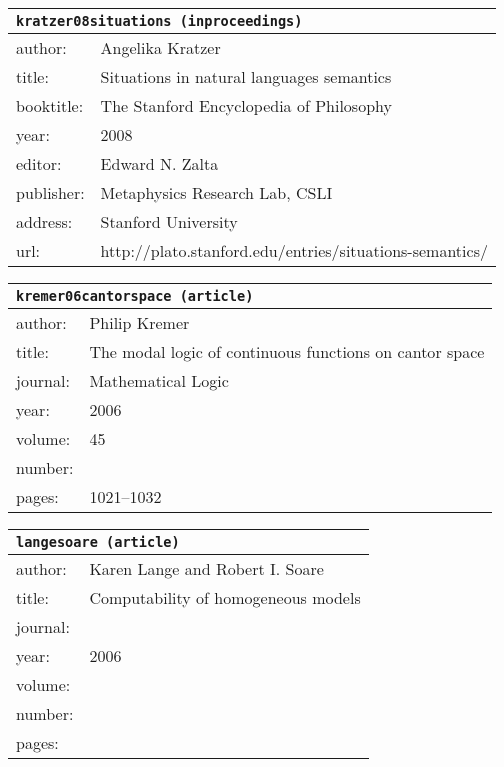 \documentclass{article}
\begin{document}
\bigskip

\begin{tabular}{p{}p{}}
\multicolumn{2}{l}{\texttt{kratzer08situations (inproceedings)}}\\
\hline
author: & Angelika Kratzer\\
title: & Situations in natural languages semantics\\
booktitle: & The Stanford Encyclopedia of Philosophy\\
year: & 2008\\
editor: & Edward N. Zalta\\
publisher: & Metaphysics Research Lab, CSLI\\
address: & Stanford University\\
url: & http://plato.stanford.edu/entries/situations-semantics/\\
\end{tabular}

\bigskip

\begin{tabular}{p{}p{}}
\multicolumn{2}{l}{\texttt{kremer06cantorspace (article)}}\\
\hline
author: & Philip Kremer\\
title: & The modal logic of continuous functions on cantor space\\
journal: & Mathematical Logic\\
year: & 2006\\
volume: & 45\\
number: & \\
pages: & 1021--1032\\
\end{tabular}

\bigskip

\begin{tabular}{p{}p{}}
\multicolumn{2}{l}{\texttt{langesoare (article)}}\\
\hline
author: & Karen Lange and Robert I. Soare\\
title: & Computability of homogeneous models\\
journal: & \\
year: & 2006\\
volume: & \\
number: & \\
pages: & \\
\end{tabular}

\bigskip
\end{document}
